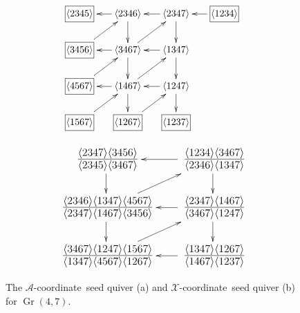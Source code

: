 \documentclass[12pt]{article}
\DeclareMathOperator{\Gr}{Gr}
\def\ket#1{\langle #1 \rangle}
\def\xcoord{$\mathcal{X}$-coordinate}
\def\acoord{$\mathcal{A}$-coordinate}
\begin{document}
\begin{figure}
\centering
\begin{subfigure}[b]{0.45\textwidth}
\begin{equation*}
\begin{gathered}
\begin{xy} 0;<-.5pt,0pt>:<0pt,-.5pt>::
         (-100,0) *+{\framebox[7ex]{$\ket{1234}$}} ="0",
	(0,0) *+{\ket{2347}} ="1",
	(100,0) *+{\ket{2346}} ="2",
	(200,0) *+{\framebox[7ex]{$\ket{2345}$}} ="3",
	(0,75) *+{\ket{1347}} ="4",
	(100,75) *+{\ket{3467}} ="5",
	(200,75) *+{\framebox[7ex]{$\ket{3456}$}} ="6",
	(0,150) *+{\ket{1247}} ="7",
	(100,150) *+{\ket{1467}} ="8",
	(200,150) *+{\framebox[7ex]{$\ket{4567}$}} ="9",
	(0,225) *+{\framebox[7ex]{$\ket{1237}$}} ="10",
	(100,225) *+{\framebox[7ex]{$\ket{1267}$}} ="11",
	(200,225) *+{\framebox[7ex]{$\ket{1567}$}} ="12",
	"0", {\ar"1"},
	"1", {\ar"2"},
	"2", {\ar"3"},
	"4", {\ar"5"},
	"5", {\ar"6"},
	"7", {\ar"8"},
	"8", {\ar"9"},
	"1", {\ar"4"},
	"2", {\ar"5"},
	"4", {\ar"7"},
	"5", {\ar"8"},
	"7", {\ar"10"},
	"8", {\ar"11"},
	"5", {\ar"1"},
	"6", {\ar"2"},
	"8", {\ar"4"},
	"9", {\ar"5"},
	"11", {\ar"7"},
	"12", {\ar"8"},
\end{xy}
\end{gathered} 
\end{equation*} 
\caption{} \label{fig:g47-a-seed}
\end{subfigure}
\hspace*{\fill} 
\begin{subfigure}[b]{0.45\textwidth}
\begin{equation*}
\begin{gathered}
\begin{xy} 0;<-.5pt,0pt>:<0pt,-.5pt>::
	(0,0) *+\txt{\fontsize{16pt}{16pt} $\frac{\ket{1234}\ket{3467}}{\ket{2346}\ket{1347}}$} ="1",
	(220,0) *+\txt{\fontsize{16pt}{16pt} $\frac{\ket{2347}\ket{3456}}{\ket{2345}\ket{3467}}$} ="2",
	(0,100) *+\txt{\fontsize{16pt}{16pt} $\frac{\ket{2347}\ket{1467}}{\ket{3467}\ket{1247}}$} ="4",
	(220,100) *+\txt{\fontsize{16pt}{16pt} $\frac{\ket{2346}\ket{1347}\ket{4567}}{\ket{2347}\ket{1467}\ket{3456}}$} ="5",
	(0,200) *+\txt{\fontsize{16pt}{16pt} $\frac{\ket{1347}\ket{1267}}{\ket{1467}\ket{1237}}$} ="7",
	(220,200) *+\txt{\fontsize{16pt}{16pt} $\frac{\ket{3467}\ket{1247}\ket{1567}}{\ket{1347}\ket{4567}\ket{1267}}$} ="8",
	"1", {\ar"2"},
	"4", {\ar"5"},
	"7", {\ar"8"},
	"1", {\ar"4"},
	"2", {\ar"5"},
	"4", {\ar"7"},
	"5", {\ar"8"},
	"5", {\ar"1"},
	"8", {\ar"4"},
\end{xy}
\end{gathered} 
\end{equation*} 
\caption{} \label{fig:g47-x-seed}
\end{subfigure}
\caption{The \acoord\ seed quiver (a) and \xcoord\ seed quiver (b) for $\Gr(4,7)$.} 
\label{fig:g47-seed}
\end{figure}
\end{document}
